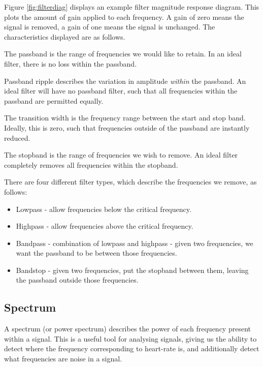\documentclass[12pt,a4paper,twoside,openany]{report}
\begin{document}
Figure \ref{fig:filterdiag} displays an example filter magnitude response
diagram. This plots the amount of gain applied to each frequency. A gain of
zero means the signal is removed, a gain of one means the signal is unchanged.
The characteristics displayed are as follows.

The passband is the range of frequencies we would like to retain. In an ideal
filter, there is no loss within the passband.

Passband ripple describes the variation in amplitude \emph{within} the
passband. An ideal filter will have no passband filter, such that all
frequencies within the passband are permitted equally.

The transition width is the frequency range between the start and stop band.
Ideally, this is zero, such that frequencies outside of the passband are
instantly reduced.

The stopband is the range of frequencies we wish to remove. An ideal filter
completely removes all frequencies within the stopband.

There are four different filter types, which describe the frequencies we remove, as
follows:

\begin{itemize}
	\item Lowpass - allow frequencies below the critical frequency.

	\item Highpass - allow frequencies above the critical frequency.

	\item Bandpass - combination of lowpass and highpass - given two
		frequencies, we want the passband to be between those
		frequencies.

	\item Bandstop - given two frequencies, put the stopband between them,
		leaving the passband outside those frequencies.
\end{itemize}

\subsection{Spectrum}

A spectrum (or power spectrum) describes the power of each frequency present
within a signal.
This is a useful tool for analysing signals, giving us the ability to detect
where the frequency corresponding to heart-rate is, and additionally detect
what frequencies are noise in a signal.
\end{document}
